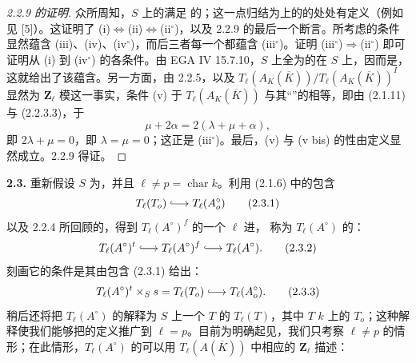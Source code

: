 \begin{proof}[2.2.9 的证明]
众所周知，$S$ 上的满足 的；这一点归结为上的的处处有定义（例如见 [5]）。这证明了 (i)$\Longleftrightarrow$(ii)$\Longleftrightarrow$(ii$^\circ$)，以及 2.2.9 的最后一个断言。所考虑的条件显然蕴含 (iii)、(iv)、(iv$^\circ$)，而后三者每一个都蕴含 (iii$^\circ$)。证明 (iii$^\circ$)$\Longrightarrow$(ii$^\circ$) 即可证明从 (i) 到 (iv$^\circ$) 的各条件。由 EGA IV 15.7.10，$S$ 上全为的在 $S$ 上，因而是，这就给出了该蕴含。另一方面，由 2.2.5，以及 $T_\ell(A_K(\overline K))/T_\ell(A_K(\overline K))^I$ 显然为 $\mathbf Z_\ell$ 模这一事实，条件 (v) 于 $T_\ell(A_K(\overline K))$ 与其“”的相等，即由 (2.1.11) 与 (2.2.3.3)，于
\[\mu+2\alpha=2(\lambda+\mu+\alpha),\]
即 $2\lambda+\mu=0$，即 $\lambda=\mu=0$；这正是 (iii$^\circ$)。最后，(v) 与 (v bis) 的性由定义显然成立。2.2.9 得证。
\end{proof}
\textbf{2.3.} 重新假设 $S$ 为，并且 $\ell\ne p=\operatorname{char}k$。利用 (2.1.6) 中的包含
\[T_\ell(T_o)\lhook\joinrel\longrightarrow T_\ell(A_o^\circ)\tag{2.3.1}\]
以及 2.2.4 所回顾的，得到 $T_\ell(A^\circ)^f$ 的一个 $\ell$ 进，
称为 $T_\ell(A^\circ)$ 的：
\[T_\ell(A^\circ)^t\lhook\joinrel\longrightarrow T_\ell(A^\circ)^f\lhook\joinrel\longrightarrow T_\ell(A^\circ).\tag{2.3.2}\]
刻画它的条件是其由包含 (2.3.1) 给出：
\[T_\ell(A^\circ)^t\times_Ss=T_\ell(T_o)\lhook\joinrel\longrightarrow T_\ell(A_o^\circ).\tag{2.3.3}\]
稍后还将把 $T_\ell(A^\circ)$ 的解释为 $S$ 上一个 $T$ 的  $T_\ell(T)$，其中 $T$  $k$ 上的 $T_o$；这种解释使我们能够把的定义推广到 $\ell=p$。目前为明确起见，我们只考察 $\ell\ne p$ 的情形；在此情形，$T_\ell(A^\circ)$ 的可以用 $T_\ell(A(\overline K))$ 中相应的 $\mathbf Z_\ell$ 描述：
